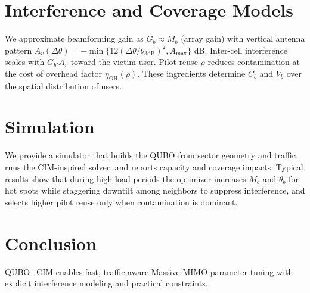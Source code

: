 \documentclass[10pt,conference]{IEEEtran}
\newcommand{\1}{\mathbf{1}}
\begin{document}
\section{Interference and Coverage Models}
We approximate beamforming gain as $G_b \approx M_b$ (array gain) with vertical antenna pattern $A_v(\Delta\theta)= -\min\{12(\Delta\theta/\theta_{\mathrm{3dB}})^2,A_{\max}\}$ dB.
Inter-cell interference scales with $G_{b'} A_v$ toward the victim user. Pilot reuse $\rho$ reduces contamination at the cost of overhead factor $\eta_{\mathrm{OH}}(\rho)$.
These ingredients determine $C_b$ and $V_b$ over the spatial distribution of users.

\section{Simulation}
We provide a simulator that builds the QUBO from sector geometry and traffic, runs the CIM-inspired solver,
and reports capacity and coverage impacts. Typical results show that during high-load periods the optimizer increases $M_b$ and $\theta_b$
for hot spots while staggering downtilt among neighbors to suppress interference, and selects higher pilot reuse only when contamination is dominant.

\section{Conclusion}
QUBO+CIM enables fast, traffic-aware Massive MIMO parameter tuning with explicit interference modeling and practical constraints.
\end{document}
